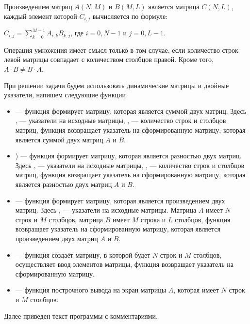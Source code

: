 Произведением матриц $A(N,M)$ и $B(M,L)$ является матрица $C(N,L)$, каждый элемент которой  $C_{i,j}$ вычисляется по формуле:

 $C_{i,j}=\sum\limits_{k=0}^{M-1}A_{i,k}B_{k,j}$, где $i = 0, N-1$ и $j = 0, L-1$. 

Операция умножения имеет смысл только в том случае, если количество строк левой матрицы совпадает с количеством столбцов
правой. Кроме того,  $A\cdot B\neq B\cdot A$. 

При решении задачи будем использовать динамические матрицы и двойные указатели, напишем следующие функции

\begin{itemize}
\item {} --- функция формирует матрицу, которая является суммой двух
матриц. Здесь ,  --- указатели на исходные матрицы, ,  --- количество строк и столбцов матриц, функция возвращает
указатель на сформированную матрицу, которая является суммой двух матриц $A$ и $B$.
\item {})  --- функция формирует матрицу, которая является разностью двух
матриц. Здесь ,  --- указатели на исходные матрицы, ,  --- количество строк и столбцов матриц, функция возвращает
указатель на сформированную матрицу, которая является разностью двух матриц $A$ и $B$.
\item {} --- функция формирует матрицу, которая является
произведением двух матриц. Здесь ,  --- указатели на исходные матрицы. 
Матрица $A$ имеет $N$ строк и $M$ столбцов, матрица $B$ имеет $M$ строка и $L$ столбцов, функция возвращает указатель 
на сформированную матрицу, которая является произведением
двух матриц $A$ и $B$.
\item {} --- функция создаёт матрицу, в которой будет $N$ строк и $M$ столбцов, 
осуществляет ввод элементов матрицы, функция возвращает указатель на сформированную матрицу.
\item {} --- функция построчного вывода на экран матрицы $A$, которая 
имеет $N$ строк и $M$ столбцов.
\end{itemize}
Далее приведен текст программы с комментариями.
